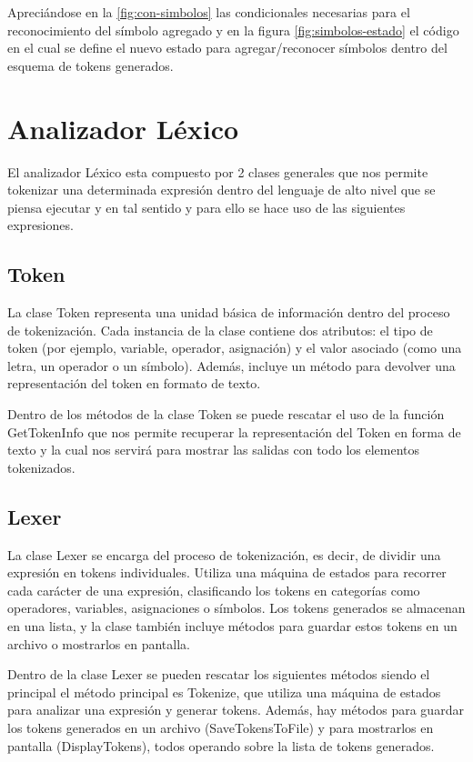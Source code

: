 \documentclass[conference]{IEEEtran}
\begin{document}
	Apreciándose en la \ref{fig:con-simbolos} las condicionales necesarias para el reconocimiento del símbolo agregado y en la figura \ref{fig:simbolos-estado} el código en el cual se define el nuevo estado para agregar/reconocer símbolos dentro del esquema de tokens generados.
	
	\section{Analizador Léxico}
	El analizador Léxico esta compuesto por 2 clases generales que nos permite tokenizar una determinada expresión dentro del lenguaje de alto nivel que se piensa ejecutar y en tal sentido y para ello se hace uso de las siguientes expresiones.
	
	\subsection{Token}
	La clase Token representa una unidad básica de información dentro del proceso de tokenización. Cada instancia de la clase contiene dos atributos: el tipo de token (por ejemplo, variable, operador, asignación) y el valor asociado (como una letra, un operador o un símbolo). Además, incluye un método para devolver una representación del token en formato de texto.
	
	Dentro de los métodos de la clase Token se puede rescatar el uso de la función GetTokenInfo que nos permite recuperar la representación del Token en forma de texto y la cual nos servirá para mostrar las salidas con todo los elementos tokenizados.
	
	\subsection{Lexer}
	La clase Lexer se encarga del proceso de tokenización, es decir, de dividir una expresión en tokens individuales. Utiliza una máquina de estados para recorrer cada carácter de una expresión, clasificando los tokens en categorías como operadores, variables, asignaciones o símbolos. Los tokens generados se almacenan en una lista, y la clase también incluye métodos para guardar estos tokens en un archivo o mostrarlos en pantalla.
	
	Dentro de la clase Lexer se pueden rescatar los siguientes métodos siendo el principal el método principal es Tokenize, que utiliza una máquina de estados para analizar una expresión y generar tokens. Además, hay métodos para guardar los tokens generados en un archivo (SaveTokensToFile) y para mostrarlos en pantalla (DisplayTokens), todos operando sobre la lista de tokens generados.
	
	
	
		
	
	
	
\end{document}
